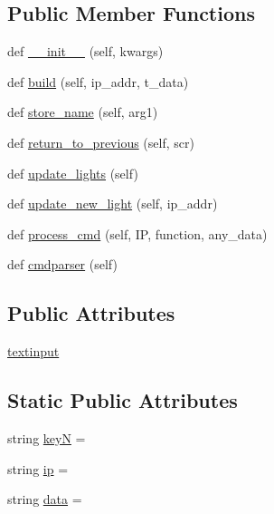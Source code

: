 \subsection*{Public Member Functions}
\begin{DoxyCompactItemize}
\item 
def \hyperlink{classnewGUI_1_1Methods_a873224e53760a7ca61d9c5a88befc5aa}{\+\_\+\+\_\+init\+\_\+\+\_\+} (self, kwargs)
\item 
def \hyperlink{classnewGUI_1_1Methods_acbe268f6bd4dc899a4c3dcd076c1432f}{build} (self, ip\+\_\+addr, t\+\_\+data)
\item 
def \hyperlink{classnewGUI_1_1Methods_ac769a2e89b24b050f487c5eedd5506ef}{store\+\_\+name} (self, arg1)
\item 
def \hyperlink{classnewGUI_1_1Methods_ade067f4ddf0252563833dcbd655c9435}{return\+\_\+to\+\_\+previous} (self, scr)
\item 
def \hyperlink{classnewGUI_1_1Methods_a0465403955e337c10807450962749da9}{update\+\_\+lights} (self)
\item 
def \hyperlink{classnewGUI_1_1Methods_afb2375ecc325fcabe3009e4a1e3a2db2}{update\+\_\+new\+\_\+light} (self, ip\+\_\+addr)
\item 
def \hyperlink{classnewGUI_1_1Methods_a0c601e13d89871308d8364e9e39e8758}{process\+\_\+cmd} (self, IP, function, any\+\_\+data)
\item 
def \hyperlink{classnewGUI_1_1Methods_ac363ff3288c8521555e675dad745c259}{cmdparser} (self)
\end{DoxyCompactItemize}
\subsection*{Public Attributes}
\begin{DoxyCompactItemize}
\item 
\hyperlink{classnewGUI_1_1Methods_a75c7db421f800cd2c2a6e0d686e13c45}{textinput}
\end{DoxyCompactItemize}
\subsection*{Static Public Attributes}
\begin{DoxyCompactItemize}
\item 
string \hyperlink{classnewGUI_1_1Methods_a08570fe44608eec16275255027ae6fb4}{keyN} = \textquotesingle{}\textquotesingle{}
\item 
string \hyperlink{classnewGUI_1_1Methods_aa72fc8db9e088fd3f8799a11d1a53e46}{ip} = \textquotesingle{}\textquotesingle{}
\item 
string \hyperlink{classnewGUI_1_1Methods_adebdd3e2274dd6c615f604dfa28653b8}{data} = \textquotesingle{}\textquotesingle{}
\end{DoxyCompactItemize}


